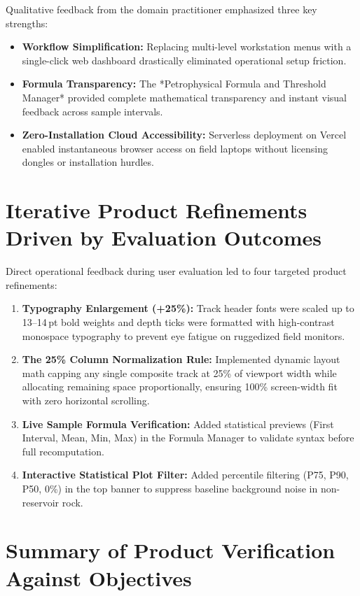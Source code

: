 Qualitative feedback from the domain practitioner emphasized three key strengths:
\begin{itemize}
    \item \textbf{Workflow Simplification:} Replacing multi-level workstation menus with a single-click web dashboard drastically eliminated operational setup friction.
    \item \textbf{Formula Transparency:} The *Petrophysical Formula and Threshold Manager* provided complete mathematical transparency and instant visual feedback across sample intervals.
    \item \textbf{Zero-Installation Cloud Accessibility:} Serverless deployment on Vercel enabled instantaneous browser access on field laptops without licensing dongles or installation hurdles.
\end{itemize}

\section{Iterative Product Refinements Driven by Evaluation Outcomes}

Direct operational feedback during user evaluation led to four targeted product refinements:
\begin{enumerate}
    \item \textbf{Typography Enlargement (+25\%):} Track header fonts were scaled up to 13–14\,pt bold weights and depth ticks were formatted with high-contrast monospace typography to prevent eye fatigue on ruggedized field monitors.
    \item \textbf{The 25\% Column Normalization Rule:} Implemented dynamic layout math capping any single composite track at 25\% of viewport width while allocating remaining space proportionally, ensuring 100\% screen-width fit with zero horizontal scrolling.
    \item \textbf{Live Sample Formula Verification:} Added statistical previews (First Interval, Mean, Min, Max) in the Formula Manager to validate syntax before full recomputation.
    \item \textbf{Interactive Statistical Plot Filter:} Added percentile filtering (P75, P90, P50, 0\%) in the top banner to suppress baseline background noise in non-reservoir rock.
\end{enumerate}

\section{Summary of Product Verification Against Objectives}

